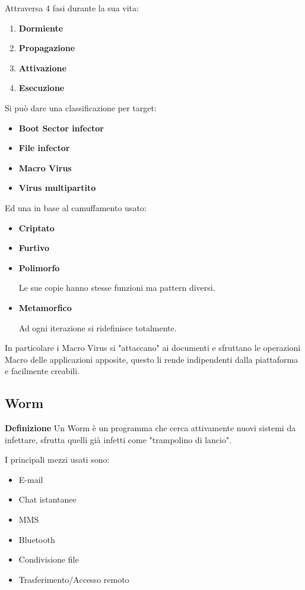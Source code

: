 \documentclass{article}
\newcommand{\df}[1]{\noindent\textbf{Definizione } #1.\newline}
\begin{document}
\noindent Attraversa 4 fasi durante la sua vita:
\begin{enumerate}
    \item \textbf{Dormiente}
    \item \textbf{Propagazione}
    \item \textbf{Attivazione}
    \item \textbf{Esecuzione}\newline
\end{enumerate}

\noindent Si può dare una classificazione per target:
\begin{itemize}
    \item \textbf{Boot Sector infector}
    \item \textbf{File infector}
    \item \textbf{Macro Virus}
    \item \textbf{Virus multipartito}
\end{itemize}

\noindent Ed una in base al camuffamento usato:
\begin{itemize}
    \item \textbf{Criptato}
    \item \textbf{Furtivo}
    \item \textbf{Polimorfo}

        Le sue copie hanno stesse funzioni ma pattern diversi.
    
    \item \textbf{Metamorfico}

        Ad ogni iterazione si ridefinisce totalmente.\newline
    
\end{itemize}

\noindent In particolare i Macro Virus si "attaccano" ai documenti e sfruttano le operazioni Macro delle applicazioni apposite, questo li rende indipendenti dalla piattaforma e facilmente creabili.\newline

\subsection{Worm}

\df{Un Worm è un programma che cerca attivamente nuovi sistemi da infettare, sfrutta quelli già infetti come "trampolino di lancio"}

\noindent I principali mezzi usati sono:
\begin{itemize}
    \item E-mail
    \item Chat istantanee
    \item MMS
    \item Bluetooth
    \item Condivisione file
    \item Trasferimento/Accesso remoto\newline
\end{itemize}
\end{document}
